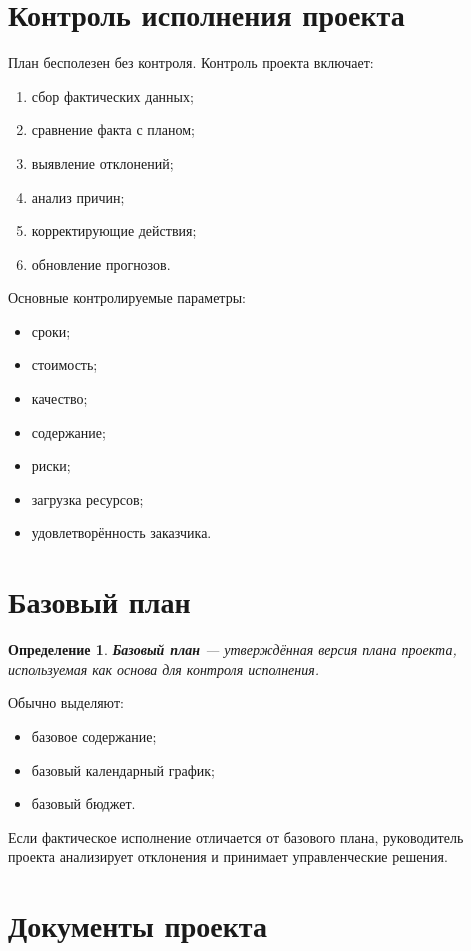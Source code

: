 \documentclass[12pt,a4paper]{article}
\newtheorem{definition}{Определение}
\begin{document}
\section{Контроль исполнения проекта}

План бесполезен без контроля. Контроль проекта включает:
\begin{enumerate}
    \item сбор фактических данных;
    \item сравнение факта с планом;
    \item выявление отклонений;
    \item анализ причин;
    \item корректирующие действия;
    \item обновление прогнозов.
\end{enumerate}

Основные контролируемые параметры:
\begin{itemize}
    \item сроки;
    \item стоимость;
    \item качество;
    \item содержание;
    \item риски;
    \item загрузка ресурсов;
    \item удовлетворённость заказчика.
\end{itemize}

\section{Базовый план}

\begin{definition}
\textbf{Базовый план} --- утверждённая версия плана проекта, используемая как основа для контроля исполнения.
\end{definition}

Обычно выделяют:
\begin{itemize}
    \item базовое содержание;
    \item базовый календарный график;
    \item базовый бюджет.
\end{itemize}

Если фактическое исполнение отличается от базового плана, руководитель проекта анализирует отклонения и принимает управленческие решения.

\section{Документы проекта}
\end{document}
